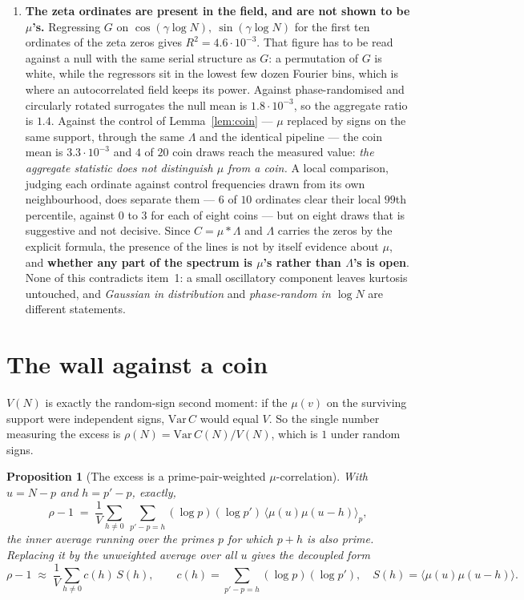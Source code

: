 \documentclass[11pt,a4paper]{article}
\theoremstyle{plain}
\newtheorem{proposition}[theorem]{Proposition}
\theoremstyle{definition}
\begin{document}
\begin{enumerate}
\item \textbf{The zeta ordinates are present in the field, and are not
  shown to be $\mu$'s.} Regressing $G$ on
  $\cos(\gamma\log N),\ \sin(\gamma\log N)$ for the first ten ordinates
  of the zeta zeros gives $R^2 = 4.6\cdot10^{-3}$. That figure has to
  be read against a null with the same serial structure as $G$: a
  permutation of $G$ is white, while the regressors sit in the lowest
  few dozen Fourier bins, which is where an autocorrelated field keeps
  its power. Against phase-randomised and circularly rotated
  surrogates the null mean is $1.8\cdot10^{-3}$, so the aggregate ratio
  is $1.4$. Against the control of Lemma~\ref{lem:coin} --- $\mu$
  replaced by signs on the same support, through the same $\Lambda$ and
  the identical pipeline --- the coin mean is $3.3\cdot10^{-3}$ and $4$
  of $20$ coin draws reach the measured value: \emph{the aggregate
  statistic does not distinguish $\mu$ from a coin.} A local
  comparison, judging each ordinate against control frequencies drawn
  from its own neighbourhood, does separate them --- $6$ of $10$
  ordinates clear their local $99$th percentile, against $0$ to $3$ for
  each of eight coins --- but on eight draws that is suggestive and not
  decisive. Since $C = \mu*\Lambda$ and $\Lambda$ carries the zeros by
  the explicit formula, the presence of the lines is not by itself
  evidence about $\mu$, and \textbf{whether any part of the spectrum is
  $\mu$'s rather than $\Lambda$'s is open}. None of this contradicts
  item~1: a small oscillatory component leaves kurtosis untouched, and
  \emph{Gaussian in distribution} and \emph{phase-random in $\log N$}
  are different statements.
\end{enumerate}

\section{The wall against a coin}\label{sec:coin}

$V(N)$ is exactly the random-sign second moment: if the $\mu(v)$ on the
surviving support were independent signs, $\mathrm{Var}\,C$ would equal
$V$. So the single number measuring the excess is
$\rho(N) = \mathrm{Var}\,C(N)/V(N)$, which is $1$ under random signs.

\begin{proposition}[The excess is a prime-pair-weighted
$\mu$-correlation]\label{prop:W}
With $u=N-p$ and $h=p'-p$, exactly,
\[
  \rho-1 \;=\; \frac1V\sum_{h\neq0}\ \sum_{p'-p=h}
    (\log p)(\log p')\,
    \bigl\langle \mu(u)\mu(u-h)\bigr\rangle_{\!p},
\]
the inner average running over the primes $p$ for which $p+h$ is also
prime. Replacing it by the unweighted average over all $u$ gives the
decoupled form
\[
  \rho-1 \;\approx\; \frac1V\sum_{h\neq0} c(h)\,S(h),
  \qquad
  c(h)=\sum_{p'-p=h}(\log p)(\log p'),
  \quad
  S(h)=\bigl\langle \mu(u)\mu(u-h)\bigr\rangle .
\]
\end{proposition}
\end{document}
